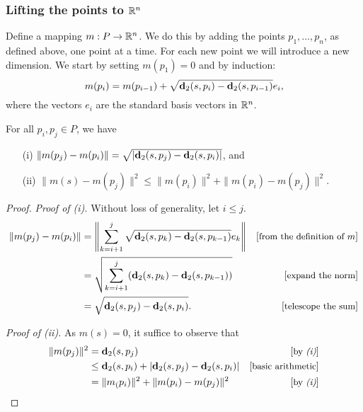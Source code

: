 \subsubsection{Lifting the points to $\mathbb{R}^n$} %
\label{sec:lifting}

 
  
  Define a mapping $m: P \to \mathbb{R}^n$.  We do this by adding the points $p_1, \ldots, p_n$, as defined above, one point at a time. 
  For each new point we will introduce a new dimension. We start by setting $m(p_1) = 0$ and by induction:
  \begin{equation}\label{eq:defn_of_m}
    m(p_i) = m(p_{i-1}) + \sqrt{\mathbf{d}_2(s, p_i) - \mathbf{d}_2(s, p_{i-1})} e_i,
  \end{equation}
  where the vectors $e_i$ are the standard basis vectors in $\mathbb{R}^n$.

  \begin{lemma}\label{lem:m_and_dist}
    For all $p_i, p_j\in P$, we have 
    \begin{enumerate}
      \item[(i)] $\|m(p_j) - m(p_i)\| = \sqrt{|\mathbf{d}_2(s,p_j) - \mathbf{d}_2(s,p_i)|}$, and
      \item[(ii)]$\|m(s) - m(p_j)\|^2 \le \|m(p_i)\|^2 + \|m(p_i) - m(p_j)\|^2$.
    \end{enumerate}
  \end{lemma}
  \begin{proof}
    \emph{Proof of (i).}
    Without loss of generality, let $i \le j$.
    \begin{align*}
      \|m(p_j) - m(p_i)\| &= \left\|\sum_{k=i+1}^j \sqrt{\mathbf{d}_2(s, p_k) - \mathbf{d}_2(s, p_{k-1})} e_k \right\| &\left[\text{\small{from the definition of $m$}}\right]\\
      &= \sqrt{\sum_{k=i+1}^j (\mathbf{d}_2(s, p_k) - \mathbf{d}_2(s, p_{k-1}))}&\left[\text{\small{expand the norm}}\right]\\
      &= \sqrt{\mathbf{d}_2(s, p_j) - \mathbf{d}_2(s, p_i)}. &\left[\text{\small{telescope the sum}}\right]
    \end{align*}

    \noindent\emph{Proof of (ii).}
    As $m(s) = 0$, it suffice to observe that
    \begin{align*}
      \|m(p_j)\|^2
        &= \mathbf{d}_2(s, p_j) &\left[\text{\small{by \emph{(i)}}}\right]\\
        &\le \mathbf{d}_2(s, p_i) + |\mathbf{d}_2(s,p_j) - \mathbf{d}_2(s,p_i)|&\left[\text{\small{basic arithmetic}}\right]\\
        &= \|m_(p_i)\|^2 + \|m(p_i) - m(p_j)\|^2 &\left[\text{\small{by \emph{(i)}}}\right]
    \end{align*}
  \end{proof}

